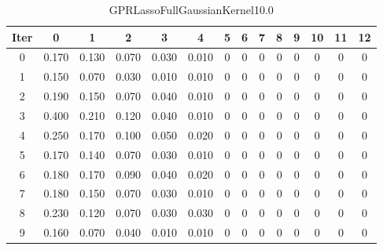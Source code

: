 \begin{table}
	\begin{center}
		\begin{tabular}{|c|c|c|c|c|c|c|c|c|c|c|c|c|c|}
			\hline
			Iter & 0 & 1 & 2 & 3 & 4 & 5 & 6 & 7 & 8 & 9 & 10 & 11 & 12 \\
			\hline
			0 & 0.170 & 0.130 & 0.070 & 0.030 & 0.010 & 0 & 0 & 0 & 0 & 0 & 0 & 0 & 0 \\
			\hline
			1 & 0.150 & 0.070 & 0.030 & 0.010 & 0.010 & 0 & 0 & 0 & 0 & 0 & 0 & 0 & 0 \\
			\hline
			2 & 0.190 & 0.150 & 0.070 & 0.040 & 0.010 & 0 & 0 & 0 & 0 & 0 & 0 & 0 & 0 \\
			\hline
			3 & 0.400 & 0.210 & 0.120 & 0.040 & 0.010 & 0 & 0 & 0 & 0 & 0 & 0 & 0 & 0 \\
			\hline
			4 & 0.250 & 0.170 & 0.100 & 0.050 & 0.020 & 0 & 0 & 0 & 0 & 0 & 0 & 0 & 0 \\
			\hline
			5 & 0.170 & 0.140 & 0.070 & 0.030 & 0.010 & 0 & 0 & 0 & 0 & 0 & 0 & 0 & 0 \\
			\hline
			6 & 0.180 & 0.170 & 0.090 & 0.040 & 0.020 & 0 & 0 & 0 & 0 & 0 & 0 & 0 & 0 \\
			\hline
			7 & 0.180 & 0.150 & 0.070 & 0.030 & 0.010 & 0 & 0 & 0 & 0 & 0 & 0 & 0 & 0 \\
			\hline
			8 & 0.230 & 0.120 & 0.070 & 0.030 & 0.030 & 0 & 0 & 0 & 0 & 0 & 0 & 0 & 0 \\
			\hline
			9 & 0.160 & 0.070 & 0.040 & 0.010 & 0.010 & 0 & 0 & 0 & 0 & 0 & 0 & 0 & 0 \\
			\hline
		\end{tabular}
	\end{center}
	\caption{GPRLassoFullGaussianKernel10.0}
\end{table}